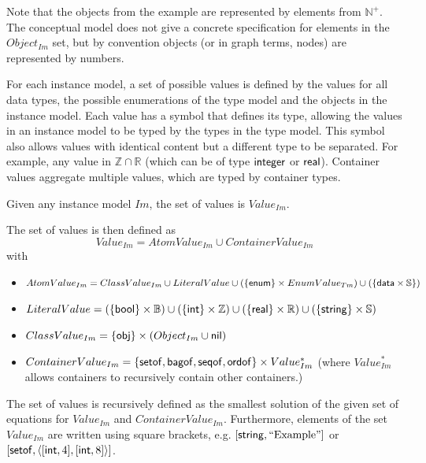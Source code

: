 Note that the objects from the example are represented by elements from $\mathbb{N}^+$. The conceptual model does not give a concrete specification for elements in the $Object_{Im}$ set, but by convention objects (or in graph terms, nodes) are represented by numbers.

For each instance model, a set of possible values is defined by the values for all data types, the possible enumerations of the type model and the objects in the instance model. Each value has a symbol that defines its type, allowing the values in an instance model to be typed by the types in the type model. This symbol also allows values with identical content but a different type to be separated. For example, any value in $\mathbb{Z} \cap \mathbb{R}$ (which can be of type $\mathsf{integer}$ or $\mathsf{real}$). Container values aggregate multiple values, which are typed by container types.

\begin{defin}[Values]
\label{defin:formalisations:ecore_formalisation:instance_models:values}
Given any instance model $Im$, the set of values is $Value_{Im}$.

The set of values is then defined as
\begin{equation*}
    Value_{Im} = AtomValue_{Im} \cup ContainerValue_{Im}
\end{equation*}
with
\begin{itemize}
    \item $AtomValue_{Im} = ClassValue_{Im} \cup LiteralValue \cup (\{ \mathsf{enum} \} \times EnumValue_{Tm}) \cup (\{ \mathsf{data} \times \mathbb{S}\})$
    \item $LiteralValue = (\{ \mathsf{bool} \} \times \mathbb{B}) \cup (\{ \mathsf{int} \} \times \mathbb{Z}) \cup (\{ \mathsf{real} \} \times \mathbb{R}) \cup (\{ \mathsf{string} \} \times \mathbb{S})$
    \item $ClassValue_{Im} = \{ \mathsf{obj} \} \times (Object_{Im} \cup { \mathsf{nil} })$
    \item $ContainerValue_{Im} = \{ \mathsf{setof}, \mathsf{bagof}, \mathsf{seqof}, \mathsf{ordof} \} \times Value_{Im}^*$ (where $Value_{Im}^*$ allows containers to recursively contain other containers.)
\end{itemize}

The set of values is recursively defined as the smallest solution of the given set of equations for $Value_{Im}$ and $ContainerValue_{Im}$. Furthermore, elements of the set $Value_{Im}$ are written using square brackets, e.g. $[\mathsf{string}, \text{``Example''}]$ or $[\mathsf{setof}, \langle [\mathsf{int}, 4], [\mathsf{int}, 8] \rangle]$.

\end{defin}

